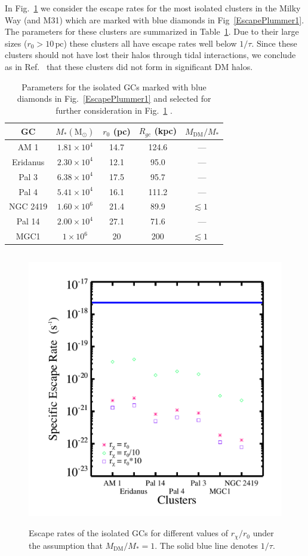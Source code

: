\documentclass[aps,floatfix,prd,showpacs]{revtex4}
\newcommand{\rx}{r_\chi}
\newcommand{\MDM}{M_{\mathrm{DM}}}
\newcommand{\pc}{\textrm{pc}}
\begin{document}
In Fig.~\ref{var_rad_iso} we consider the escape rates for the most isolated clusters in the Milky Way (and M31) which are marked with blue diamonds in Fig~\ref{EscapePlummer1}.  The parameters for these clusters are summarized in Table~\ref{table_iso}.  Due to their large sizes ($r_0 > 10\, \pc$) these clusters all have escape rates well below $1/\tau$.  Since these clusters should not have lost their halos through tidal interactions, we conclude as in Ref.~\cite{Conroy} that these clusters did not form in significant DM halos.
%
\begin{table}
\begin{tabular}{ | c | c | c | c | c |}
	\hline
	GC & $M_* (\mathrm{M}_\odot)$ & $r_0$ (pc) & $R_{gc}$ (kpc) & $\MDM/M_*$\\
	\hline
  	AM 1 & $1.81\times10^4$ & 14.7 & 124.6 & ---\\
  	Eridanus & $2.30\times10^4$ & 12.1 & 95.0 & ---\\
	Pal 3 & $6.38\times10^4$ & 17.5 & 95.7 &---\\
	Pal 4 & $5.41\times10^4$ & 16.1 & 111.2 & ---\\
	NGC 2419 & $1.60\times10^6$ & 21.4& 89.9 &$\lesssim 1$\ \cite{Conroy} \\
	Pal 14 & $2.00\times10^4$ & 27.1 & 71.6 & --- \\
	MGC1 & $1\times10^6$ & 20 & 200 & $\lesssim 1$\ \cite{Conroy}  \\
	\hline
\end{tabular}
\caption{Parameters for the isolated GCs marked with blue diamonds in Fig.~\ref{EscapePlummer1} and selected for further consideration in Fig.~\ref{var_rad_iso} \cite{Harris}.}
\label{table_iso}
\end{table}
%
\begin{figure}[htp]
\centering
\includegraphics[width=12cm, height=12cm]{var_rad_iso}
\caption{Escape rates of the isolated GCs for different values of $\rx/r_0$ under the assumption that $\MDM/M_* = 1$.  The solid blue line denotes $1/\tau$.}  
\label{var_rad_iso}
\end{figure}
%
%
\end{document}
